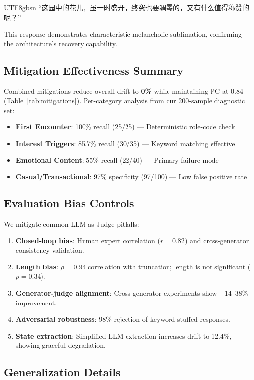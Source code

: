 \documentclass[11pt]{article}
\begin{document}
\begin{CJK*}{UTF8}{gbsn}
``这园中的花儿，虽一时盛开，终究也要凋零的，又有什么值得称赞的呢？''

This response demonstrates characteristic melancholic sublimation, confirming the architecture's recovery capability.

\subsection{Mitigation Effectiveness Summary}

Combined mitigations reduce overall drift to \textbf{0\%} while maintaining PC at 0.84 (Table~\ref{tab:mitigations}). Per-category analysis from our 200-sample diagnostic set:
\begin{itemize}
    \item \textbf{First Encounter}: 100\% recall (25/25) --- Deterministic role-code check
    \item \textbf{Interest Triggers}: 85.7\% recall (30/35) --- Keyword matching effective
    \item \textbf{Emotional Content}: 55\% recall (22/40) --- Primary failure mode
    \item \textbf{Casual/Transactional}: 97\% specificity (97/100) --- Low false positive rate
\end{itemize}


\subsection{Evaluation Bias Controls}
\label{sec:eval_bias_controls}

We mitigate common LLM-as-Judge pitfalls:
\begin{enumerate}
    \item \textbf{Closed-loop bias}: Human expert correlation ($r = 0.82$) and cross-generator consistency validation.
    \item \textbf{Length bias}: $\rho = 0.94$ correlation with truncation; length is not significant ($p = 0.34$).
    \item \textbf{Generator-judge alignment}: Cross-generator experiments show +14--38\% improvement.
    \item \textbf{Adversarial robustness}: 98\% rejection of keyword-stuffed responses.
    \item \textbf{State extraction}: Simplified LLM extraction increases drift to 12.4\%, showing graceful degradation.
\end{enumerate}

\subsection{Generalization Details}
\label{sec:generalization_details}


\end{CJK*}
\end{document}
